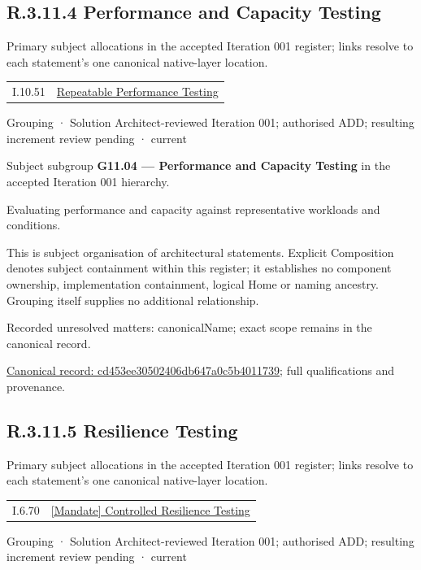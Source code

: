 \subsection*{R.3.11.4 Performance and Capacity Testing}
\label{navigation:R.3.11.4}

Primary subject allocations in the accepted Iteration 001 register; links resolve to each statement’s one canonical native-layer location.\par
\begin{longtable}{p{.22\linewidth}p{.73\linewidth}}
I.10.51 & \hyperref[element:1c2eb4d9aef4425288528907fed7ebc2]{Repeatable Performance Testing} \\
\end{longtable}
\label{element:cd453ee30502406db647a0c5b4011739}
{\small Grouping · Solution Architect-reviewed Iteration 001; authorised ADD; resulting increment review pending · current}\par

Subject subgroup \textbf{G11.04 — Performance and Capacity Testing} in the accepted Iteration 001 hierarchy.



Evaluating performance and capacity against representative workloads and conditions.



This is subject organisation of architectural statements. Explicit Composition denotes subject containment within this register; it establishes no component ownership, implementation containment, logical Home or naming ancestry. Grouping itself supplies no additional relationship.


{\small Recorded unresolved matters: canonicalName; exact scope remains in the canonical record.}\par
{\footnotesize \href{../../../../continuum/grouping/cd453ee30502406db647a0c5b4011739.md}{Canonical record: cd453ee30502406db647a0c5b4011739}; full qualifications and provenance.}\par
\subsection*{R.3.11.5 Resilience Testing}
\label{navigation:R.3.11.5}

Primary subject allocations in the accepted Iteration 001 register; links resolve to each statement’s one canonical native-layer location.\par
\begin{longtable}{p{.22\linewidth}p{.73\linewidth}}
I.6.70 & \hyperref[element:f2d38e7beef84b61a769de4ca7f48951]{[Mandate] Controlled Resilience Testing} \\
\end{longtable}
\label{element:d3fb5abc58af4347ab52cdc26e9b14f1}
{\small Grouping · Solution Architect-reviewed Iteration 001; authorised ADD; resulting increment review pending · current}\par

